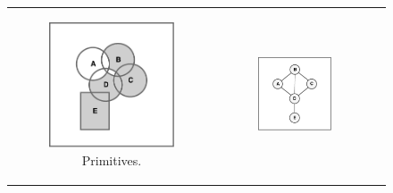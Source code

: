 \begin{figure}[htb]
	\centering
	\begin{tabular}[c]{ccc}
		\begin{subfigure}[c]{0.30\linewidth}
			\includegraphics[width=\textwidth]{figures/pipe_0.pdf}
			\caption{Primitives.}
			\label{fig:pipe0}
		\end{subfigure}&
		\begin{subfigure}[c]{0.30\linewidth}
			\includegraphics[width=\textwidth]{figures/pipe_1.pdf}

\end{subfigure}
\end{tabular}
\end{figure}
